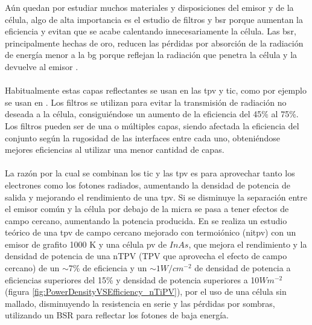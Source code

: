 Aún quedan por estudiar muchos materiales y disposiciones del emisor y de la célula, algo de alta importancia es el estudio de filtros y \acrshort{bsr} porque aumentan la eficiencia y evitan que se acabe calentando innecesariamente la célula. Las \acrshort{bsr}, principalmente hechas de oro, reducen las pérdidas por absorción de la radiación de energía menor a la \acrshort{bg} porque reflejan la radiación que penetra la célula y la devuelve al emisor \cite{nTPV_Review}.\\\\
Habitualmente estas capas reflectantes se usan en las \acrshort{tpv} y \acrshort{tic}, como por ejemplo se usan en \cite{thermoionic_TPV_NF,modelEfficiency_NF_TPV,thermophotovoltaic_40}. Los filtros se utilizan para evitar la transmisión de radiación no deseada a la célula, consiguiéndose un aumento de la eficiencia del 45\% al 75\%. Los filtros pueden ser de una o múltiples capas, siendo afectada la eficiencia del conjunto según la rugosidad de las interfaces entre cada uno, obteniéndose mejores eficiencias al utilizar una menor cantidad de capas\cite{multiLayerFilters}.\\\\
La razón por la cual se combinan los \acrshort{tic} y las \acrshort{tpv} es para aprovechar tanto los electrones como los fotones radiados, aumentando la densidad de potencia de salida y mejorando el rendimiento de una \acrshort{tpv}. Si se disminuye la separación entre el emisor común y la célula por debajo de la micra se pasa a tener efectos de campo cercano, aumentando la potencia producida. En \cite{thermoionic_TPV_NF} se realiza un estudio teórico de una \acrshort{tpv} de campo cercano mejorado con termoiónico (\acrshort{nitpv}) con un emisor de grafito 1000 K y una célula \acrshort{pv} de $InAs$, que mejora el rendimiento y la densidad de potencia de una nTPV (TPV que aprovecha el efecto de campo cercano) de un $\sim$7\% de eficiencia y un $\sim 1 W/cm^{-2}$ de densidad de potencia a eficiencias superiores del 15\% y  densidad de potencia superiores a 10$Wm^{-2}$ (figura \ref{fig:PowerDensityVSEfficiency_nTiPV}), por el uso de una célula sin mallado, disminuyendo la resistencia en serie y las pérdidas por sombras, utilizando un BSR para reflectar los fotones de baja energía.\\

